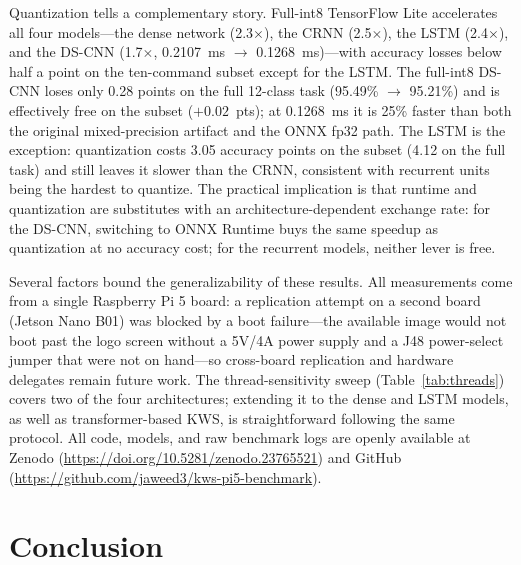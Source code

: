 \documentclass[conference,a4paper]{IEEEtran}
\begin{document}
Quantization tells a complementary story. Full-int8 TensorFlow Lite accelerates all four models---the dense network (2.3$\times$), the CRNN (2.5$\times$), the LSTM (2.4$\times$), and the DS-CNN (1.7$\times$, 0.2107~ms $\rightarrow$ 0.1268~ms)---with accuracy losses below half a point on the ten-command subset except for the LSTM. The full-int8 DS-CNN loses only 0.28 points on the full 12-class task (95.49\% $\rightarrow$ 95.21\%) and is effectively free on the subset ($+0.02$~pts); at 0.1268~ms it is 25\% faster than both the original mixed-precision artifact and the ONNX fp32 path. The LSTM is the exception: quantization costs 3.05 accuracy points on the subset (4.12 on the full task) and still leaves it slower than the CRNN, consistent with recurrent units being the hardest to quantize. The practical implication is that runtime and quantization are substitutes with an architecture-dependent exchange rate: for the DS-CNN, switching to ONNX Runtime buys the same speedup as quantization at no accuracy cost; for the recurrent models, neither lever is free.

Several factors bound the generalizability of these results. All measurements come from a single Raspberry Pi 5 board: a replication attempt on a second board (Jetson Nano B01) was blocked by a boot failure---the available image would not boot past the logo screen without a 5V/4A power supply and a J48 power-select jumper that were not on hand---so cross-board replication and hardware delegates remain future work. The thread-sensitivity sweep (Table~\ref{tab:threads}) covers two of the four architectures; extending it to the dense and LSTM models, as well as transformer-based KWS, is straightforward following the same protocol. All code, models, and raw benchmark logs are openly available at Zenodo (\url{https://doi.org/10.5281/zenodo.23765521}) and GitHub (\url{https://github.com/jaweed3/kws-pi5-benchmark}).

\balance
\section{Conclusion}
\end{document}
